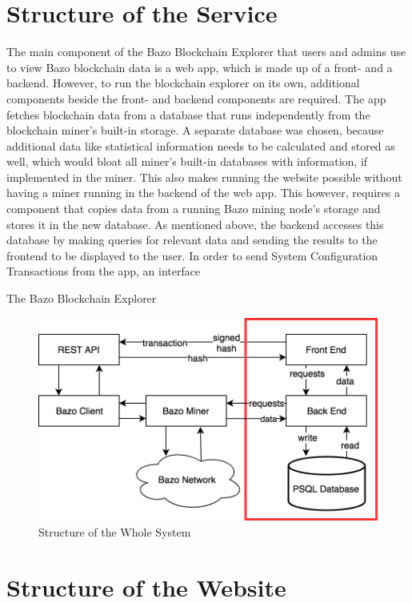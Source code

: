 \section{Structure of the Service}
The main component of the Bazo Blockchain Explorer that users and admins use to view Bazo blockchain data is a web app, which is made up of a front- and a backend. However, to run the blockchain explorer on its own, additional components beside the front- and backend components are required. The app fetches blockchain data from a database that runs independently from the blockchain miner's built-in storage. A separate database was chosen, because additional data like statistical information needs to be calculated and stored as well, which would bloat all miner's built-in databases with information, if implemented in the miner. This also makes running the website possible without having a miner running in the backend of the web app. This however, requires a component that copies data from a running Bazo mining node's storage and stores it in the new database. As mentioned above, the backend accesses this database by making queries for relevant data and sending the results to the frontend to be displayed to the user.
In order to send System Configuration Transactions from the app, an interface 

The Bazo Blockchain Explorer 

\begin{figure}
  \includegraphics[width=\linewidth]{system.png}
  \caption{Structure of the Whole System}
  \label{fig:structure}
\end{figure}

\section{Structure of the Website}


